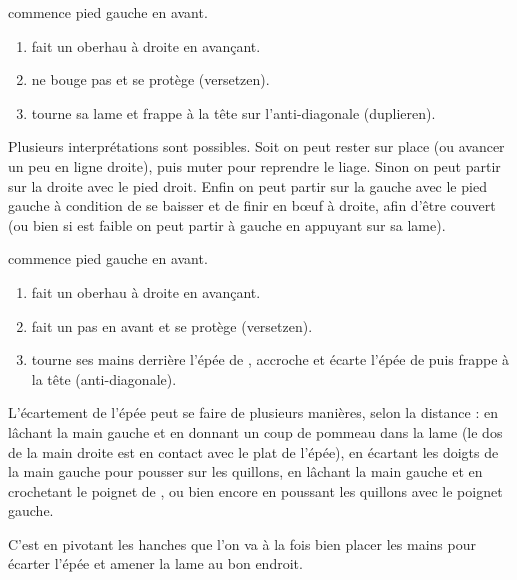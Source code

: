 \begin{technique}
\label{épée-longue:tech:dg-fechten-duplieren}

\A commence pied gauche en avant.

\begin{enumerate}
	\item \A fait un oberhau à droite en avançant.
	\item \D ne bouge pas et se protège (versetzen).
	\item \A tourne sa lame et frappe à la tête sur l'anti-diagonale (duplieren).
\end{enumerate}

Plusieurs interprétations sont possibles.
Soit on peut rester sur place (ou avancer un peu en ligne droite), puis muter pour reprendre le liage.
Sinon on peut partir sur la droite avec le pied droit.
Enfin on peut partir sur la gauche avec le pied gauche à condition de se baisser et de finir en bœuf à droite, afin d'être couvert (ou bien si \D est faible on peut partir à gauche en appuyant sur sa lame).

\end{technique}


\begin{technique}
\label{épée-longue:tech:dg-kriegen-absetzen}

\A commence pied gauche en avant.

\begin{enumerate}
	\item \A fait un oberhau à droite en avançant.
	\item \D fait un pas en avant et se protège (versetzen).
	\item \A tourne ses mains derrière l'épée de \D, accroche et écarte l'épée de \D puis frappe à la tête (anti-diagonale).
\end{enumerate}

L'écartement de l'épée peut se faire de plusieurs manières, selon la distance : en lâchant la main gauche et en donnant un coup de pommeau dans la lame (le dos de la main droite est en contact avec le plat de l'épée), en écartant les doigts de la main gauche pour pousser sur les quillons, en lâchant la main gauche et en crochetant le poignet de \D, ou bien encore en poussant les quillons avec le poignet gauche.

C'est en pivotant les hanches que l'on va à la fois bien placer les mains pour écarter l'épée et amener la lame au bon endroit.

\end{technique}


